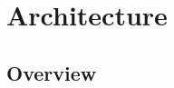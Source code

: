 \begin{comment}
\section{Sending Uplink Signals}

Uplink signals are sent with an Arduino device equipped with a LoRa shield. 
The Arduino is controlled with an adapted form of the IBM LoraMAC-in-C (LMIC) library, modified to run on Arduino devices.
Using this library, we implemented a simple communication protocol where a queue of packets is sent out in an interval.
See section~\ref{sec:comm_prot} for detailed information.

\section{RRH and BBU}
For splitting up the LoRa gateway's functionality we use two laptops. 
One laptop has the LimeSDR mini plugged in and serves as the RRH. The other decodes the LoRa
signal in software, processes the signal and also generates LoRa signals in software and sends those downlink I/Q samples back to the RRH.
The processes on the second laptop run in virtualized environment with Docker, more specifically Docker compose, Docker's orchestration tool.
\\
The LoRa OOT module by Robyns' et al. has a branch called "encoder" where they began the implementation of modulating an uplink LoRa signal in software.
It is able to generate a specific test packet but the modulated signal has errors as we saw when we inspected the data payload on the LoRa gateway.
Having an uplink signal generator was a nice starting point, but we needed something to generate downlink signal. In the end we extended the existing implementation
by adding a downlink signal generation ability, see section~\ref{chap:lora_tools}.
\\
Based on these considerations, as a first workaround we set up a private LoRaWAN network, scheduled a downlink, and recorded it to a file. Now we can stream that file as a response by streaming its content,
which are I/Q samples, to the RRH.
\end{comment}

\section{Architecture}
\subsection{Overview}


